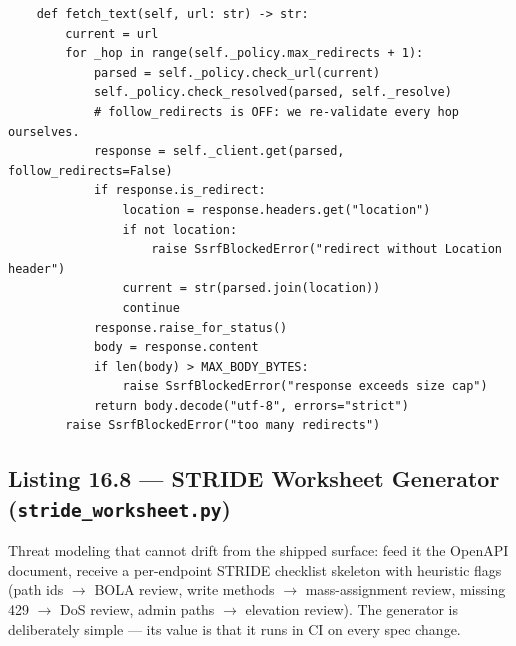 \begin{verbatim}
    def fetch_text(self, url: str) -> str:
        current = url
        for _hop in range(self._policy.max_redirects + 1):
            parsed = self._policy.check_url(current)
            self._policy.check_resolved(parsed, self._resolve)
            # follow_redirects is OFF: we re-validate every hop ourselves.
            response = self._client.get(parsed, follow_redirects=False)
            if response.is_redirect:
                location = response.headers.get("location")
                if not location:
                    raise SsrfBlockedError("redirect without Location header")
                current = str(parsed.join(location))
                continue
            response.raise_for_status()
            body = response.content
            if len(body) > MAX_BODY_BYTES:
                raise SsrfBlockedError("response exceeds size cap")
            return body.decode("utf-8", errors="strict")
        raise SsrfBlockedError("too many redirects")
\end{verbatim}

\subsection{Listing 16.8 --- STRIDE Worksheet Generator (\texttt{stride\_worksheet.py})}
\label{lst:ch16-stride}

Threat modeling that cannot drift from the shipped surface: feed it the
OpenAPI document, receive a per-endpoint STRIDE checklist skeleton with
heuristic flags (path ids $\to$ BOLA review, write methods $\to$
mass-assignment review, missing 429 $\to$ DoS review, admin paths $\to$
elevation review). The generator is deliberately simple --- its value is
that it runs in CI on every spec change.

